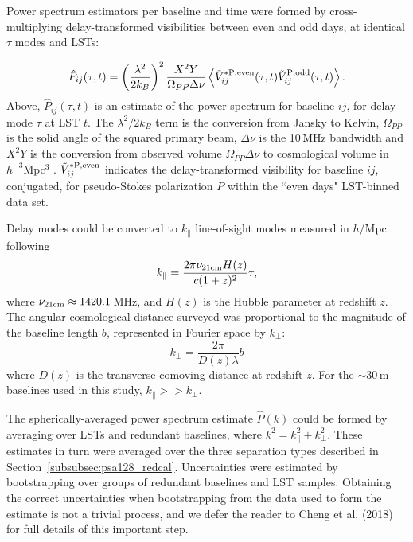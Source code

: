 Power spectrum estimators per baseline and time were formed by cross-multiplying delay-transformed visibilities between even and odd days, at identical $\tau$ modes and LSTs:

\begin{equation}
\hat{P}_{ij}(\tau, t) = \left(\frac{\lambda^2}{2k_B}\right)^2 \frac{X^2Y}{\Omega_{PP}\Delta\nu} \left\langle \tilde{V}^{\rm* P, even}_{ij}(\tau,t) \tilde{V}^{\rm P, odd}_{ij}(\tau,t) \right\rangle.
\end{equation}
Above, $\hat{P}_{ij}(\tau, t)$ is an estimate of the power spectrum for baseline $ij$, for delay mode $\tau$ at LST $t$. The $\lambda^2/2k_B$ term is the conversion from Jansky to Kelvin, $\Omega_{PP}$ is the solid angle of the squared primary beam, $\Delta\nu$ is the 10\,MHz bandwidth and $X^2Y$ is the conversion from observed volume $\Omega_{PP}\Delta\nu$ to cosmological volume in $h^{-3}$Mpc$^3$ \citep{Parsons.12b}. $\tilde{V}^{\rm* P, even}_{ij}$ indicates the delay-transformed visibility for baseline $ij$, conjugated, for pseudo-Stokes polarization $P$ within the ``even days" LST-binned data set.

Delay modes could be converted to $k_{\parallel}$ line-of-sight modes measured in $h$/Mpc following
\begin{equation}
k_{\parallel} = \frac{2\pi \nu_{\rm 21cm} H(z)}{c(1+z)^2}\tau,
\end{equation}
where $\nu_{\rm 21cm}\approx1420.1$\,MHz, and $H(z)$ is the Hubble parameter at redshift $z$. The angular cosmological distance surveyed was proportional to the magnitude of the baseline length $b$, represented in Fourier space by $k_{\perp}$:
\begin{equation}
k_{\perp} = \frac{2\pi}{D(z)\lambda}b
\end{equation}
where $D(z)$ is the transverse comoving distance at redshift $z$. For the $\sim$30\,m baselines used in this study, $k_{\parallel}>>k_{\perp}$. 

The spherically-averaged power spectrum estimate $\hat{P}(k)$ could be formed by averaging over LSTs and redundant baselines, where $k^2 = k_{\parallel}^2 + k_{\perp}^2$. These estimates in turn were averaged over the three separation types described in Section~\ref{subsubsec:psa128_redcal}. Uncertainties were estimated by bootstrapping over groups of redundant baselines and LST samples. Obtaining the correct uncertainties when bootstrapping from the data used to form the estimate is not a trivial process, and we defer the reader to {\color{red} Cheng et al. (2018)} for full details of this important step. 

